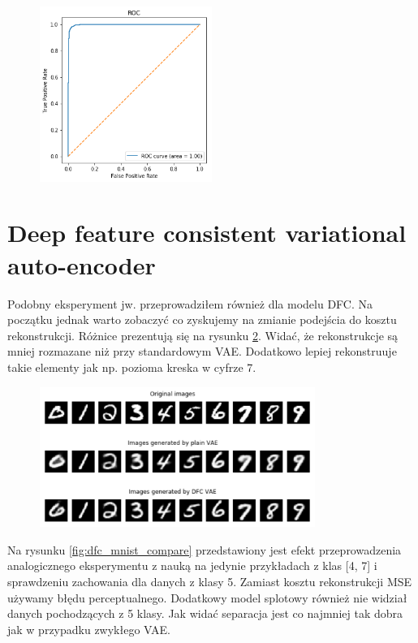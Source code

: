 \begin{figure}[h!]
    \centering
    \includegraphics[width=0.5\textwidth]{images/mnist_roc}
    \caption{}
    \label{fig:mnist_roc}
\end{figure}

\section{Deep feature consistent variational auto-encoder}

Podobny eksperyment jw. przeprowadziłem również dla modelu DFC. Na początku jednak warto zobaczyć co zyskujemy na zmianie podejścia do kosztu rekonstrukcji. Różnice prezentują się na rysunku \ref{fig:vae_dfc_recon}. Widać, że rekonstrukcje są mniej rozmazane niż przy standardowym VAE. Dodatkowo lepiej rekonstruuje takie elementy jak np. pozioma kreska w cyfrze 7. 

\begin{figure}[h!]
    \centering
    \includegraphics[width=0.8\textwidth]{images/vae_dfc_gen}
    \caption{}
    \label{fig:vae_dfc_recon}
\end{figure}

Na rysunku \ref{fig:dfc_mnist_compare} przedstawiony jest efekt przeprowadzenia analogicznego eksperymentu z nauką na jedynie przykładach z klas [4, 7] i sprawdzeniu zachowania dla danych z klasy 5. Zamiast kosztu rekonstrukcji MSE używamy błędu perceptualnego. Dodatkowy model splotowy również nie widział danych pochodzących z 5 klasy. Jak widać separacja jest co najmniej tak dobra jak w przypadku zwykłego VAE.

